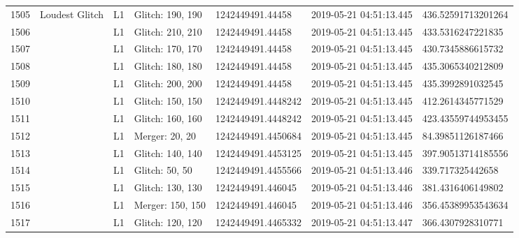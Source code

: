 \begin{longtable}{lllllll}
1505 &                                     Loudest Glitch &       L1 &  Glitch: 190, 190 &    1242449491.44458 &  2019-05-21 04:51:13.445 &  436.52591713201264 \\
1506 &                                                    &       L1 &  Glitch: 210, 210 &    1242449491.44458 &  2019-05-21 04:51:13.445 &   433.5316247221835 \\
1507 &                                                    &       L1 &  Glitch: 170, 170 &    1242449491.44458 &  2019-05-21 04:51:13.445 &   430.7345886615732 \\
1508 &                                                    &       L1 &  Glitch: 180, 180 &    1242449491.44458 &  2019-05-21 04:51:13.445 &   435.3065340212809 \\
1509 &                                                    &       L1 &  Glitch: 200, 200 &    1242449491.44458 &  2019-05-21 04:51:13.445 &   435.3992891032545 \\
1510 &                                                    &       L1 &  Glitch: 150, 150 &  1242449491.4448242 &  2019-05-21 04:51:13.445 &   412.2614345771529 \\
1511 &                                                    &       L1 &  Glitch: 160, 160 &  1242449491.4448242 &  2019-05-21 04:51:13.445 &  423.43559744953455 \\
1512 &                                                    &       L1 &    Merger: 20, 20 &  1242449491.4450684 &  2019-05-21 04:51:13.445 &   84.39851126187466 \\
1513 &                                                    &       L1 &  Glitch: 140, 140 &  1242449491.4453125 &  2019-05-21 04:51:13.445 &  397.90513714185556 \\
1514 &                                                    &       L1 &    Glitch: 50, 50 &  1242449491.4455566 &  2019-05-21 04:51:13.446 &    339.717325442658 \\
1515 &                                                    &       L1 &  Glitch: 130, 130 &   1242449491.446045 &  2019-05-21 04:51:13.446 &   381.4316406149802 \\
1516 &                                                    &       L1 &  Merger: 150, 150 &   1242449491.446045 &  2019-05-21 04:51:13.446 &  356.45389953543634 \\
1517 &                                                    &       L1 &  Glitch: 120, 120 &  1242449491.4465332 &  2019-05-21 04:51:13.447 &   366.4307928310771 \\

\end{longtable}
